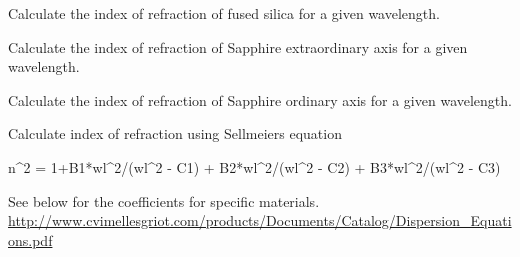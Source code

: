 \documentclass[letterpaper,10pt,english]{sphinxmanual}
\begin{document}
\begin{fulllineitems}
\label{api/gtrace.optics:gtrace.optics.consts.n_fused_silica}
Calculate the index of refraction of fused silica for a given wavelength.

\end{fulllineitems}


\begin{fulllineitems}
\label{api/gtrace.optics:gtrace.optics.consts.n_sapphire_extraordinary}
Calculate the index of refraction of Sapphire extraordinary axis for a given wavelength.

\end{fulllineitems}


\begin{fulllineitems}
\label{api/gtrace.optics:gtrace.optics.consts.n_sapphire_ordinary}
Calculate the index of refraction of Sapphire ordinary axis for a given wavelength.

\end{fulllineitems}


\begin{fulllineitems}
\label{api/gtrace.optics:gtrace.optics.consts.sellmeier}
Calculate index of refraction using Sellmeiers equation

n\textasciicircum{}2 = 1+B1*wl\textasciicircum{}2/(wl\textasciicircum{}2 - C1) + B2*wl\textasciicircum{}2/(wl\textasciicircum{}2 - C2) + B3*wl\textasciicircum{}2/(wl\textasciicircum{}2 - C3)

See below for the coefficients for specific materials.
\href{http://www.cvimellesgriot.com/products/Documents/Catalog/Dispersion\_Equations.pdf}{http://www.cvimellesgriot.com/products/Documents/Catalog/Dispersion\_Equations.pdf}

\end{fulllineitems}
\end{document}
